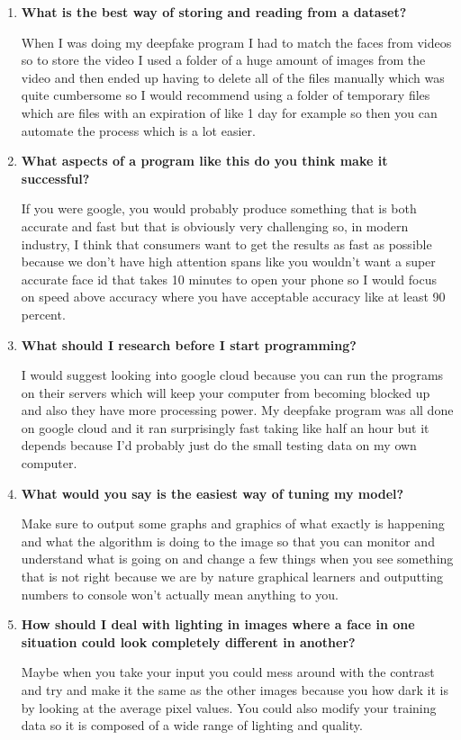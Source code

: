 \begin{enumerate}
    \item \textbf{What is the best way of storing and reading from a dataset?}
    \par
    When I was doing my deepfake program I had to match the faces from videos so to store the video I used a folder of a huge amount of images from the video and then ended up having to delete all of the files manually which was quite cumbersome so I would recommend using a folder of temporary files which are files with an expiration of like 1 day for example so then you can automate the process which is a lot easier.
    \item \textbf{What aspects of a program like this do you think make it successful?}
    \par
    If you were google, you would probably produce something that is both accurate and fast but that is obviously very challenging so, in modern industry, I think that consumers want to get the results as fast as possible because we don't have high attention spans like you wouldn't want a super accurate face id that takes 10 minutes to open your phone so I would focus on speed above accuracy where you have acceptable accuracy like at least 90 percent.
    \item \textbf{What should I research before I start programming?}
    \par
    I would suggest looking into google cloud because you can run the programs on their servers which will keep your computer from becoming blocked up and also they have more processing power. My deepfake program was all done on google cloud and it ran surprisingly fast taking like half an hour but it depends because I'd probably just do the small testing data on my own computer.
    \item \textbf{What would you say is the easiest way of tuning my model?}
    \par
    Make sure to output some graphs and graphics of what exactly is happening and what the algorithm is doing to the image so that you can monitor and understand what is going on and change a few things when you see something that is not right because we are by nature graphical learners and outputting numbers to console won't actually mean anything to you.
    \item \textbf{How should I deal with lighting in images where a face in one situation could look completely different in another?}
    \par
    Maybe when you take your input you could mess around with the contrast and try and make it the same as the other images because you how dark it is by looking at the average pixel values. You could also modify your training data so it is composed of a wide range of lighting and quality.
\end{enumerate}

